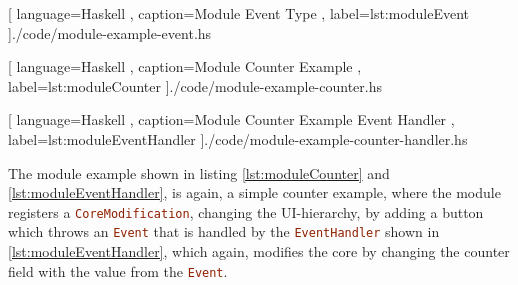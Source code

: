 \begin{center}
  
    [ language=Haskell
    , caption={Module Event Type}
    , label=lst:moduleEvent
    ]{./code/module-example-event.hs}
\end{center}

\begin{center}
  
    [ language=Haskell
    , caption={Module Counter Example}
    , label=lst:moduleCounter
    ]{./code/module-example-counter.hs}
\end{center}

\begin{center}
  
    [ language=Haskell
    , caption={Module Counter Example Event Handler}
    , label=lst:moduleEventHandler
    ]{./code/module-example-counter-handler.hs}
\end{center}

The module example shown in listing \ref{lst:moduleCounter} and
\ref{lst:moduleEventHandler}, is again, a simple counter example, where the
module registers a \lstinline[language=Haskell]{CoreModification}, changing the
UI-hierarchy, by adding a button which throws an
\lstinline[language=Haskell]{Event} that is handled by the
\lstinline[language=Haskell]{EventHandler} shown in
\ref{lst:moduleEventHandler}, which again, modifies the core by changing the
counter field with the value from the \lstinline[language=Haskell]{Event}.
